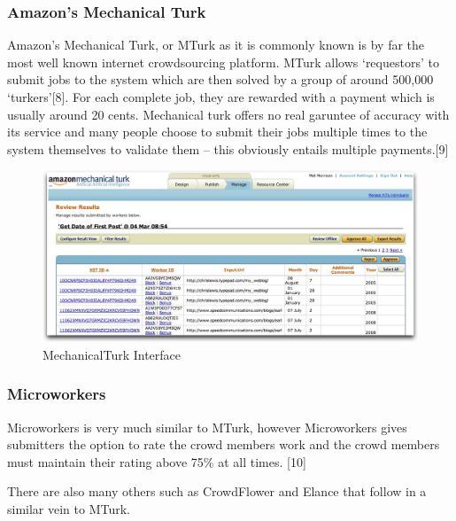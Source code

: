\documentclass[11pt]{article}
\begin{document}
\subsubsection{Amazon's Mechanical Turk}
Amazon's Mechanical Turk, or MTurk as it is commonly known is by far the most well known
internet crowdsourcing platform. MTurk allows `requestors' to submit jobs to the 
system which are then solved by a group of around 500,000 `turkers'[8]. For each 
complete job, they are rewarded with a payment which is usually around 20 cents.
Mechanical turk offers no real garuntee of accuracy 
with its service and many people choose to submit their jobs multiple times to the
system themselves to validate them -- this obviously entails multiple payments.[9]


\begin{figure}[H]
\begin{center}
\includegraphics[width=\linewidth]{images/mturkinterface.jpg}
\caption{MechanicalTurk Interface}
\label{default}
\end{center}
\end{figure}



\subsubsection{Microworkers}
Microworkers is very much similar to MTurk, however Microworkers gives submitters the 
option to rate the crowd members work and the crowd members must maintain their rating above 75\% at
all times. [10]

There are also many others such as CrowdFlower and Elance that follow in a similar vein to MTurk.
\end{document}

